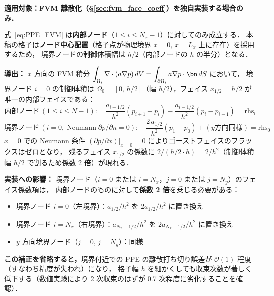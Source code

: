 \begin{tcolorbox}[warnbox, title={ノード中心 FVM における境界ノードの制御体積補正（FVM 実装専用）}]
\label{warn:boundary_cv}
\begin{center}
\end{center}

\textbf{適用対象：FVM 離散化（§\ref{sec:fvm_face_coeff}）を独自実装する場合のみ．}

\medskip

式~\eqref{eq:PPE_FVM} は\textbf{内部ノード}（$1 \le i \le N_x-1$）に対してのみ成立する．
本稿の格子は\textbf{ノード中心配置}（格子点が物理境界 $x=0,\,x=L_x$ 上に存在）を採用するため，
境界ノードの制御体積幅は $h/2$（内部ノードの $h$ の半分）となる．

\medskip
\textbf{導出：} $x$ 方向の FVM 積分 $\displaystyle\int_{\Omega_i} \nabla\cdot(a\nabla p)\,dV = \int_{\partial\Omega_i} a\nabla p\cdot\bn\,dS$ において，
境界ノード $i=0$ の制御体積は $\Omega_0 = [0,\,h/2]$（幅 $h/2$），フェイス $x_{1/2}=h/2$ が唯一の内部フェイスである：
\[
  \text{内部ノード}\,(1\le i\le N-1): \quad
  \frac{a_{i+1/2}}{h^2}(p_{i+1}-p_i) - \frac{a_{i-1/2}}{h^2}(p_i - p_{i-1}) = \text{rhs}_i
\]
\[
  \text{境界ノード}\,(i=0,\;\text{Neumann}\;\partial p/\partial n=0): \quad
  \boxed{\frac{2\,a_{1/2}}{h^2}(p_1 - p_0)} + (\text{$y$方向同様}) = \text{rhs}_0
\]
$x=0$ での Neumann 条件 $(\partial p/\partial x)|_{x=0}=0$ によりゴーストフェイスのフラックスはゼロとなり，
残るフェイス $x_{1/2}$ の係数に $2/(h/2 \cdot h) = 2/h^2$（制御体積幅 $h/2$ で割るため係数 2 倍）が現れる．

\medskip
\textbf{実装への影響：} 境界ノード（$i=0$ または $i=N_x$，$j=0$ または $j=N_y$）のフェイス係数項は，
内部ノードのものに対して\textbf{係数 2 倍}を乗じる必要がある：
\begin{itemize}
  \item 境界ノード $i=0$（左境界）：$a_{1/2}/h^2$ を $2a_{1/2}/h^2$ に置き換え
  \item 境界ノード $i=N_x$（右境界）：$a_{N_x-1/2}/h^2$ を $2a_{N_x-1/2}/h^2$ に置き換え
  \item $y$ 方向境界ノード（$j=0,\,j=N_y$）：同様
\end{itemize}

\textbf{この補正を省略すると，}境界付近での PPE の離散打ち切り誤差が $\mathcal{O}(1)$ 程度（すなわち精度が失われ）になり，
格子幅 $h$ を細かくしても収束次数が著しく低下する（数値実験により 2 次収束のはずが 0.7 次程度に劣化することを確認）．
\end{tcolorbox}


